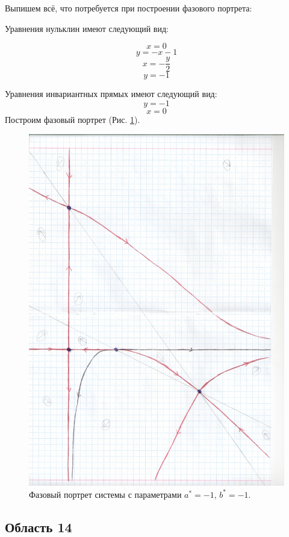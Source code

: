 Выпишем всё, что потребуется при построении фазового портрета:

Уравнения нульклин имеют следующий вид: 

$$x=0$$
$$y=- x - 1$$
$$x=- \frac{y}{2}$$
$$y=-1$$


Уравнения инвариантных прямых имеют следующий вид: 
$$y = -1$$
$$x = 0$$
Построим фазовый портрет (Рис. \ref{fig:phportr13}).

\begin{figure}[h]
	
	\includegraphics[width=\textwidth]{phptr/(-16,-12).jpg}
	\centering
	\caption{\label{fig:phportr13} Фазовый портрет системы с параметрами $a^\ast = -1$, $b^\ast = -1$.}
	
\end{figure}

\subsection{Область 14}

